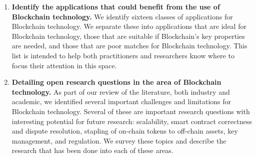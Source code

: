 \begin{enumerate}
	\item \textbf{Identify the applications that could benefit from the use of Blockchain technology.}
	We identify sixteen classes of applications for Blockchain technology.
	We separate these into applications that are ideal for Blockchain technology, those that are suitable if Blockchain's key properties are needed, and those that are poor matches for Blockchain technology.
	This list is intended to help both practitioners and researchers know where to focus their attention in this space.
	
	\item \textbf{Detailing open research questions in the area of Blockchain technology.}
	As part of our review of the literature, both industry and academic, we identified several important challenges and limitations for Blockchain technology.
	Several of these are important research questions with interesting potential for future research: scalability, smart contract correctness and dispute resolution, stapling of on-chain tokens to off-chain assets, key management, and regulation.
	We survey these topics and describe the research that has been done into each of these areas.
	
\end{enumerate}
